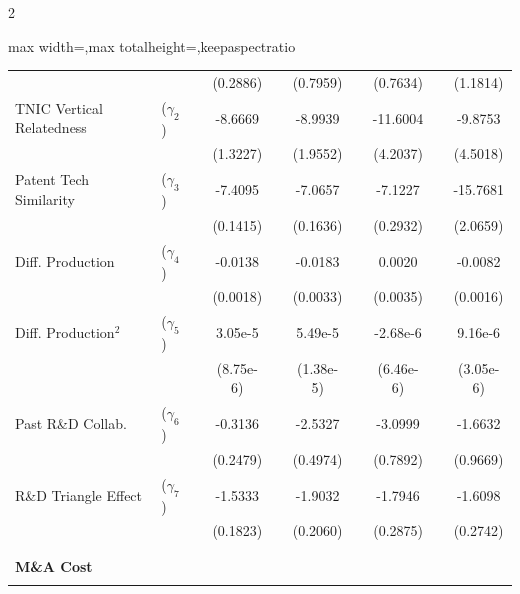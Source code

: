 \documentclass[12pt]{article}
\begin{document}
\begin{spacing}{2}
\begin{table}[tbp]
\begin{center}
\begin{adjustbox}{max width=\textwidth,max totalheight=\textheight,keepaspectratio}
\begin{threeparttable}
\begin{tabular}{llcccccccc}
                             &               &  &        (0.2886) &  &           (0.7959) &  &          (0.7634) &  &        (1.1814) \\
    TNIC Vertical Relatedness     & ($\gamma_2$)  &  &        -8.6669  &  &           -8.9939  &  &          -11.6004 &  &        -9.8753  \\
                             &               &  &        (1.3227) &  &           (1.9552) &  &          (4.2037) &  &        (4.5018) \\
    Patent Tech Similarity   & ($\gamma_3$)  &  &        -7.4095  &  &           -7.0657  &  &          -7.1227  &  &        -15.7681 \\
                             &               &  &       (0.1415) &  &           (0.1636) &  &          (0.2932) &  &        (2.0659) \\ 
    Diff. Production         & ($\gamma_4$)  &  &        -0.0138  &  &           -0.0183  &  &          0.0020   &  &        -0.0082  \\
                             &               &  &        (0.0018) &  &           (0.0033) &  &          (0.0035) &  &        (0.0016) \\
    Diff. Production${}^{2}$ & ($\gamma_5$)  & &        3.05e-5  & &           5.49e-5  &  &        -2.68e-6 &   &     9.16e-6   \\
                             &               &  &      (8.75e-6)&     &      (1.38e-5)&     &     (6.46e-6)&   &     (3.05e-6) \\
    Past R\&D Collab.        & ($\gamma_6$)  &  &      -0.3136  &   &        -2.5327  &   &       -3.0999  &   &     -1.6632  \\
                             &               &  &      (0.2479) &  &         (0.4974) &  &        (0.7892) & &       (0.9669) \\
    R\&D Triangle Effect     & ($\gamma_7$)  &   &     -1.5333  &    &       -1.9032  &    &      -1.7946  &  &      -1.6098  \\
                             &               &  &      (0.1823) &   &        (0.2060) &      &    (0.2875) &     &   (0.2742) \\ 
\vspace{-0.25cm}\\
\hdashline[0.4pt/2pt]
\vspace{-0.25cm}\\
    \multicolumn{6}{l}{\bf M\&A Cost} \\
    \vspace{-0.25cm}\\

\end{tabular}
\end{threeparttable}
\end{adjustbox}
\end{center}
\end{table}
\end{spacing}
\end{document}
